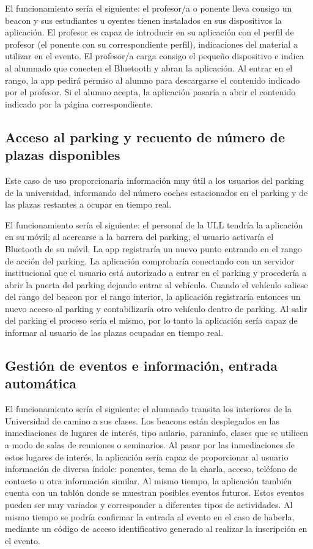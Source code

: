 El funcionamiento sería el siguiente: el profesor/a o ponente lleva consigo un beacon y sus estudiantes u oyentes tienen instalados en sus dispositivos la aplicación. El profesor es capaz de introducir en su aplicación con el perfil de profesor (el ponente con su correspondiente perfil), indicaciones del material a utilizar en el evento. El profesor/a carga consigo el pequeño dispositivo e indica al alumnado que conecten el Bluetooth y abran la aplicación. Al entrar en el rango, la app pedirá permiso al alumno para descargarse el contenido indicado por el profesor. Si el alumno acepta, la aplicación pasaría a abrir  el contenido indicado por la página correspondiente.


\subsection{Acceso al parking y recuento de número de plazas disponibles}


Este caso de uso proporcionaría información muy útil a los usuarios del parking de la universidad, informando del número coches estacionados en el parking y de las plazas restantes a ocupar en tiempo real.

El funcionamiento sería el siguiente: el personal de la ULL tendría la aplicación en su móvil; al acercarse a la barrera del parking, el usuario activaría el Bluetooth de su móvil. La app registraría un nuevo punto entrando en el rango de acción del parking. La aplicación comprobaría conectando con un servidor institucional que el usuario está autorizado a entrar en el parking y procedería a abrir la puerta del parking dejando entrar al vehículo. Cuando el vehículo saliese del rango del beacon por el rango interior, la aplicación registraría entonces un nuevo acceso al parking y contabilizaría otro vehículo dentro de parking. Al salir del parking el proceso sería el mismo, por lo tanto la aplicación sería capaz de informar al usuario de las plazas ocupadas en tiempo real.


\subsection{Gestión de eventos e información, entrada automática}

El funcionamiento sería el siguiente: el alumnado transita los interiores de la Universidad de camino a sus clases. Los beacons están desplegados en las inmediaciones de lugares de interés, tipo aulario, paraninfo, clases que se utilicen a modo de salas de reuniones o seminarios. Al pasar por las inmediaciones de estos lugares de interés, la aplicación sería capaz de proporcionar al usuario información de diversa índole: ponentes, tema de la charla, acceso, teléfono de contacto u otra información similar.  Al mismo tiempo, la aplicación también cuenta con un tablón donde se muestran posibles eventos futuros. Estos eventos pueden ser muy variados y corresponder a diferentes tipos de actividades. Al mismo tiempo se podría confirmar la entrada al evento en el caso de haberla, mediante un código de acceso identificativo generado al realizar la inscripción en el evento.

